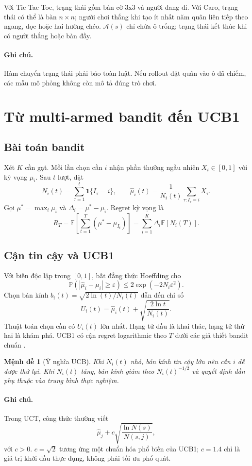 \documentclass[conference]{IEEEtran}
\newtheorem{proposition}[definition]{Mệnh đề}
\newcommand{\E}{\mathbb{E}}
\newcommand{\Prob}{\mathbb{P}}
\begin{document}
Với Tic-Tac-Toe, trạng thái gồm bàn cờ 3x3 và người đang đi. Với Caro, trạng
thái có thể là bàn $n\times n$; người chơi thắng khi tạo ít nhất năm quân liên
tiếp theo ngang, dọc hoặc hai hướng chéo. $\mathcal A(s)$ chỉ chứa ô trống;
trạng thái kết thúc khi có người thắng hoặc bàn đầy.

\paragraph{Ghi chú.} Hàm chuyển trạng thái phải bảo toàn luật. Nếu rollout đặt
quân vào ô đã chiếm, các mẫu mô phỏng không còn mô tả đúng trò chơi.

\section{Từ multi-armed bandit đến UCB1}
\subsection{Bài toán bandit}
Xét $K$ cần gạt. Mỗi lần chọn cần $i$ nhận phần thưởng ngẫu nhiên $X_i\in[0,1]$
với kỳ vọng $\mu_i$. Sau $t$ lượt, đặt
\[
N_i(t)=\sum_{\tau=1}^{t}\mathbf 1\{I_\tau=i\},\qquad
\widehat\mu_i(t)=\frac{1}{N_i(t)}\sum_{\tau:I_\tau=i}X_\tau.
\]
Gọi $\mu^*=\max_i\mu_i$ và $\Delta_i=\mu^*-\mu_i$. Regret kỳ vọng là
\[
R_T=\E\!\left[\sum_{t=1}^{T}(\mu^*-\mu_{I_t})\right]
=\sum_{i=1}^{K}\Delta_i\E[N_i(T)].
\]

\subsection{Cận tin cậy và UCB1}
Với biến độc lập trong $[0,1]$, bất đẳng thức Hoeffding cho
\[
\Prob(|\widehat\mu_i-\mu_i|\geq\varepsilon)
\leq 2\exp(-2N_i\varepsilon^2).
\]
Chọn bán kính $b_i(t)=\sqrt{2\ln(t)/N_i(t)}$ dẫn đến chỉ số
\[
U_i(t)=\widehat\mu_i(t)+\sqrt{\frac{2\ln t}{N_i(t)}}.
\]
Thuật toán chọn cần có $U_i(t)$ lớn nhất. Hạng tử đầu là khai thác, hạng tử
thứ hai là khám phá. UCB1 có cận regret logarithmic theo $T$ dưới các giả thiết
bandit chuẩn \cite{auer2002}.

\begin{proposition}[Ý nghĩa UCB]
Khi $N_i(t)$ nhỏ, bán kính tin cậy lớn nên cần $i$ dễ được thử lại. Khi $N_i(t)$
tăng, bán kính giảm theo $N_i(t)^{-1/2}$ và quyết định dần phụ thuộc vào trung
bình thực nghiệm.
\end{proposition}

\paragraph{Ghi chú.} Trong UCT, công thức thường viết
\[
\widehat\mu_j+c\sqrt{\frac{\ln N(s)}{N(s,j)}},
\]
với $c>0$. $c=\sqrt2$ tương ứng một chuẩn hóa phổ biến của UCB1; $c=1.4$ chỉ
là giá trị khởi đầu thực dụng, không phải tối ưu phổ quát.
\end{document}

